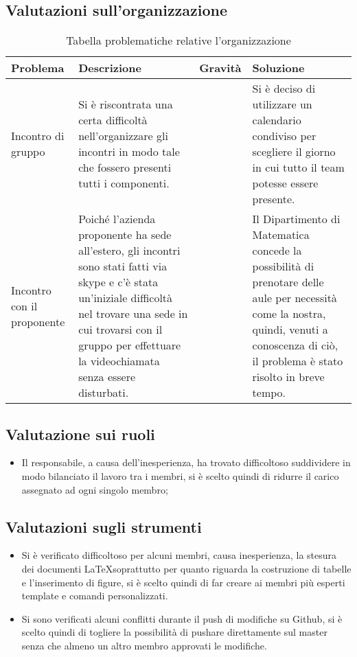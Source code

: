 \subsection{Valutazioni sull'organizzazione}
\begin{table}[H]
	
	\begin{longtable}{ >{\centering}p{} >{\centering}p{}
			>{\centering}p{} >{\centering}p{}}
			
		\hline
		\rowcolorhead
		\textbf{\color{white}Problema} 
		& \textbf{\color{white}Descrizione} 
		& \centering\textbf{\color{white}Gravità}
		& \textbf{\color{white}Soluzione} 
		\tabularnewline \hline 	
		
		Incontro di gruppo &
		Si è riscontrata una certa difficoltà nell'organizzare gli incontri in modo
		tale che fossero presenti tutti i componenti. &
		2 &
		Si è deciso di utilizzare un calendario condiviso per scegliere il giorno
		in cui tutto il team potesse essere presente. 
				
		\tabularnewline 
		Incontro con il proponente &
		Poiché l'azienda proponente ha sede all'estero, gli incontri sono stati fatti 
		via skype e c'è stata un'iniziale difficoltà nel trovare una sede in cui 
		trovarsi con il gruppo per effettuare la videochiamata senza essere disturbati. &
		1 &
		Il Dipartimento di Matematica concede la possibilità di prenotare delle aule
		per necessità come la nostra, quindi, venuti a conoscenza di ciò, il problema 
		è stato risolto in breve tempo.
			
	\end{longtable}
	\caption{Tabella problematiche relative l'organizzazione}	
\end{table}

\subsection{Valutazione sui ruoli}
\begin{itemize}
\item Il responsabile, a causa dell'inesperienza, ha trovato difficoltoso suddividere in modo bilanciato il lavoro tra i membri, si è scelto quindi di ridurre il carico assegnato ad ogni singolo membro;
\end{itemize}
\subsection{Valutazioni sugli strumenti}
\begin{itemize}
\item Si è verificato difficoltoso per alcuni membri, causa inesperienza, la stesura dei documenti \LaTeX  soprattutto per quanto riguarda la costruzione di tabelle e l'inserimento di figure, si è scelto quindi di far creare ai membri più esperti template e comandi personalizzati.
\item Si sono verificati alcuni conflitti durante il push di modifiche su Github, si è scelto quindi di togliere la possibilità di pushare direttamente sul master senza che almeno un altro membro approvati le modifiche. 
\end{itemize}